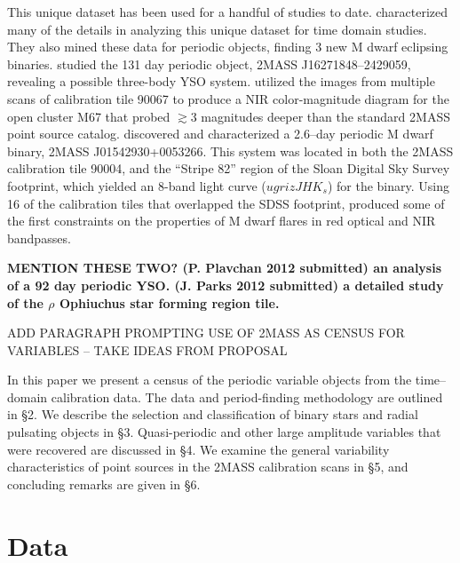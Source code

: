 \documentclass[]{emulateapj}
\begin{document}
This unique dataset has been used for a handful of studies to date. 
\citet{2008ApJS..175..191P} characterized many of the details in analyzing this unique dataset for time domain studies. They also mined these data for periodic objects, finding 3 new M dwarf eclipsing binaries. 
\citet{2008ApJ...684L..37P} studied the 131 day periodic object, 2MASS J16271848--2429059, revealing a possible three-body YSO system. 
\citet{2009ApJ...698.1872S} utilized the images from multiple scans of calibration tile 90067 to produce a NIR color-magnitude diagram for the open cluster M67 that probed $\gtrsim$3 magnitudes deeper than the standard 2MASS point source catalog. 
\citet{2008MNRAS.386..416B} discovered and characterized a 2.6--day periodic M dwarf binary, 2MASS J01542930+0053266. This system was located in both the 2MASS calibration tile 90004, and the ``Stripe 82'' region of the Sloan Digital Sky Survey footprint, which yielded an 8-band light curve ($ugrizJHK_s$) for the binary. 
Using 16 of the calibration tiles that overlapped the SDSS footprint, \citet{2012ApJ...748...58D} produced some of the first constraints on the properties of M dwarf flares in red optical and NIR bandpasses. 


{\bf 
MENTION THESE TWO? 
(P. Plavchan 2012 submitted) an analysis of a 92 day periodic YSO. 
(J. Parks 2012 submitted) a detailed study of the $\rho$ Ophiuchus star forming region tile. 

ADD PARAGRAPH PROMPTING USE OF 2MASS AS CENSUS FOR VARIABLES -- TAKE IDEAS FROM PROPOSAL
}

In this paper we present a census of the periodic variable objects from the time--domain calibration data. The data and period-finding methodology are outlined in \S2. We describe the selection and classification of binary stars and radial pulsating objects in \S3. Quasi-periodic and other large amplitude variables that were recovered are discussed in \S4. We examine the general variability characteristics of point sources in the 2MASS calibration scans in \S5, and concluding remarks are given in \S6.



\vspace{.1in}

\section{Data}
\end{document}
